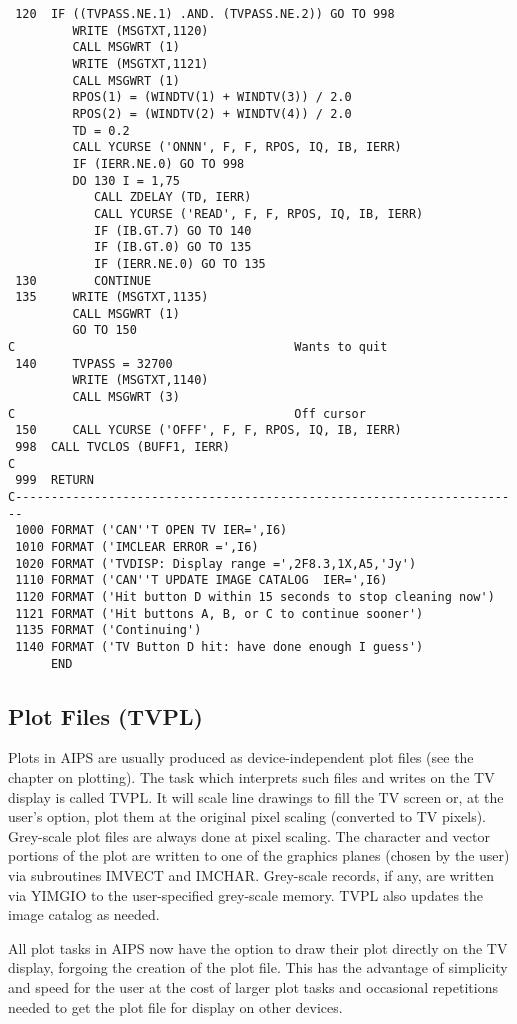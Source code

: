 \begin{verbatim}
 120  IF ((TVPASS.NE.1) .AND. (TVPASS.NE.2)) GO TO 998
         WRITE (MSGTXT,1120)
         CALL MSGWRT (1)
         WRITE (MSGTXT,1121)
         CALL MSGWRT (1)
         RPOS(1) = (WINDTV(1) + WINDTV(3)) / 2.0
         RPOS(2) = (WINDTV(2) + WINDTV(4)) / 2.0
         TD = 0.2
         CALL YCURSE ('ONNN', F, F, RPOS, IQ, IB, IERR)
         IF (IERR.NE.0) GO TO 998
         DO 130 I = 1,75
            CALL ZDELAY (TD, IERR)
            CALL YCURSE ('READ', F, F, RPOS, IQ, IB, IERR)
            IF (IB.GT.7) GO TO 140
            IF (IB.GT.0) GO TO 135
            IF (IERR.NE.0) GO TO 135
 130        CONTINUE
 135     WRITE (MSGTXT,1135)
         CALL MSGWRT (1)
         GO TO 150
C                                       Wants to quit
 140     TVPASS = 32700
         WRITE (MSGTXT,1140)
         CALL MSGWRT (3)
C                                       Off cursor
 150     CALL YCURSE ('OFFF', F, F, RPOS, IQ, IB, IERR)
 998  CALL TVCLOS (BUFF1, IERR)
C
 999  RETURN
C-----------------------------------------------------------------------
 1000 FORMAT ('CAN''T OPEN TV IER=',I6)
 1010 FORMAT ('IMCLEAR ERROR =',I6)
 1020 FORMAT ('TVDISP: Display range =',2F8.3,1X,A5,'Jy')
 1110 FORMAT ('CAN''T UPDATE IMAGE CATALOG  IER=',I6)
 1120 FORMAT ('Hit button D within 15 seconds to stop cleaning now')
 1121 FORMAT ('Hit buttons A, B, or C to continue sooner')
 1135 FORMAT ('Continuing')
 1140 FORMAT ('TV Button D hit: have done enough I guess')
      END
\end{verbatim}

\subsection{Plot Files (TVPL)}
Plots in AIPS are usually produced as device-independent plot files
(see the chapter on plotting). The task which interprets such files
and writes on the TV display is called TVPL.  It will scale line
drawings to fill the TV screen or, at the user's option, plot them at
the original pixel scaling (converted to TV pixels).  Grey-scale plot
files are always done at pixel scaling.  The character and vector
portions of the plot are written to one of the graphics planes (chosen
by the user) via subroutines IMVECT and IMCHAR.  Grey-scale records,
if any, are written via YIMGIO to the user-specified grey-scale
memory.  TVPL also updates the image catalog as needed.

All plot tasks in AIPS now have the option to draw their plot directly
on the TV display, forgoing the creation of the plot file.  This has
the advantage of simplicity and speed for the user at the cost of
larger plot tasks and occasional repetitions needed to get the plot
file for display on other devices.

